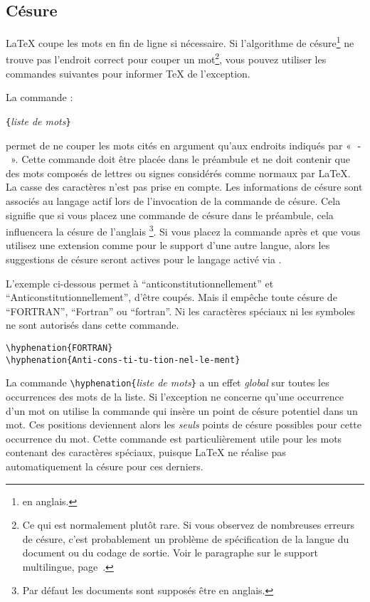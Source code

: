 \subsection{Césure} \label{hyph}
\LaTeX{} coupe les mots en fin de ligne si nécessaire. Si l'algorithme de
césure\footnote{ en anglais.} ne trouve pas
l'endroit correct pour couper un mot\footnote{Ce qui est normalement
plutôt rare. Si vous observez de nombreuses erreurs de césure, c'est
probablement un problème de spécification de la langue du document ou
du codage de sortie. Voir le paragraphe sur le support multilingue,
page~\pageref{international}.}, vous pouvez utiliser les
commandes suivantes pour informer \TeX{} de l'exception.

La commande :
\begin{lscommand}
\verb|{|\emph{liste de mots}\verb|}|
\end{lscommand}
\noindent permet de ne couper les mots cités en argument qu'aux
endroits indiqués par «~\verb|-|~». Cette commande doit être
placée dans le préambule et ne doit contenir que des mots composés de
lettres ou signes considérés comme normaux par \LaTeX{}. La casse des
caractères n'est pas prise en compte. Les informations de césure sont
associés au langage actif lors de l'invocation de la commande de
césure. Cela signifie que si vous placez une commande de césure dans
le préambule, cela influencera la césure de l'anglais \footnote{Par défaut
les documents sont supposés être en anglais. \NdT}. Si vous placez la
commande après \verb|| et que vous utilisez une
extension comme  pour le support d'une autre langue,
alors les suggestions de césure seront actives pour le langage
activé via .

L'exemple ci-dessous permet à
\enquote{anticonstitutionnellement} et \enquote{Anticonstitutionnellement},
d'être coupés. Mais il empêche toute césure de
\enquote{FORTRAN}, \enquote{Fortran} ou \enquote{fortran}. Ni les
caractères spéciaux ni les symboles ne sont autorisés dans cette
commande.

\begin{code}
\verb|\hyphenation{FORTRAN}|\\
\verb|\hyphenation{Anti-cons-ti-tu-tion-nel-le-ment}|
\end{code}

La commande \verb|\hyphenation{|\emph{liste de mots}\verb|}| a un effet
\emph{global} sur toutes les occurrences des mots de la liste.
Si l'exception ne concerne qu'une occurrence d'un mot on utilise
la commande \ci{-} qui insère un point de  césure potentiel dans un
mot. Ces positions deviennent alors les \emph{seuls} points de césure
possibles pour cette occurrence du mot. Cette commande est
particulièrement utile pour les mots contenant des caractères
spéciaux, puisque \LaTeX{} ne réalise pas automatiquement la césure
pour ces derniers.

